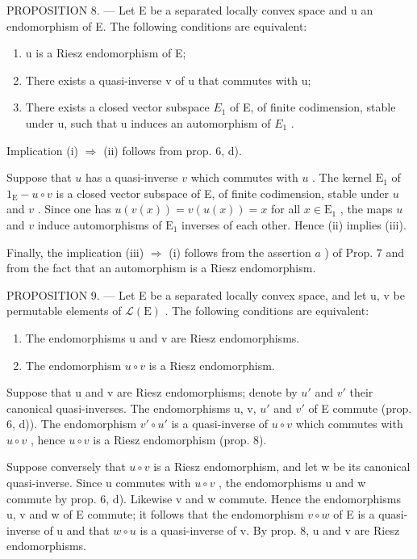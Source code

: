 PROPOSITION 8. --- Let E be a separated locally convex space and u an endomorphism of E. The following conditions are equivalent:

\begin{enumerate}
\def\labelenumi{(\roman{enumi})}
\item
  u is a Riesz endomorphism of E;
\item
  There exists a quasi-inverse v of u that commutes with u;
\item
  There exists a closed vector subspace \(E_{1}\) of E, of finite codimension, stable under u, such that u induces an automorphism of \(E_{1}\) .
\end{enumerate}

Implication (i) \(\Longrightarrow\) (ii) follows from prop. 6, d).

Suppose that \(u\) has a quasi-inverse \(v\) which commutes with \(u\) . The kernel \(\mathrm{E}_1\) of \(1_{\mathrm{E}} - u \circ v\) is a closed vector subspace of E, of finite codimension, stable under \(u\) and \(v\) . Since one has \(u(v(x)) = v(u(x)) = x\) for all \(x \in \mathrm{E}_1\) , the maps \(u\) and \(v\) induce automorphisms of \(\mathrm{E}_1\) inverses of each other. Hence (ii) implies (iii).

Finally, the implication (iii) \(\Longrightarrow\) (i) follows from the assertion \(a\) ) of Prop. 7 and from the fact that an automorphism is a Riesz endomorphism.

PROPOSITION 9. --- Let E be a separated locally convex space, and let u, v be permutable elements of \(\mathcal{L}(\mathrm{E})\) . The following conditions are equivalent:

\begin{enumerate}
\def\labelenumi{(\roman{enumi})}
\item
  The endomorphisms u and v are Riesz endomorphisms.
\item
  The endomorphism \(u \circ v\) is a Riesz endomorphism.
\end{enumerate}

Suppose that u and v are Riesz endomorphisms; denote by \(u'\) and \(v'\) their canonical quasi-inverses. The endomorphisms u, v, \(u'\) and \(v'\) of E commute (prop. 6, d)). The endomorphism \(v' \circ u'\) is a quasi-inverse of \(u \circ v\) which commutes with \(u \circ v\) , hence \(u \circ v\) is a Riesz endomorphism (prop. 8).

Suppose conversely that \(u \circ v\) is a Riesz endomorphism, and let w be its canonical quasi-inverse. Since u commutes with \(u \circ v\) , the endomorphisms u and w commute by prop. 6, d). Likewise v and w commute. Hence the endomorphisms u, v and w of E commute; it follows that the endomorphism \(v \circ w\) of E is a quasi-inverse of u and that \(w \circ u\) is a quasi-inverse of v. By prop. 8, u and v are Riesz endomorphisms.

